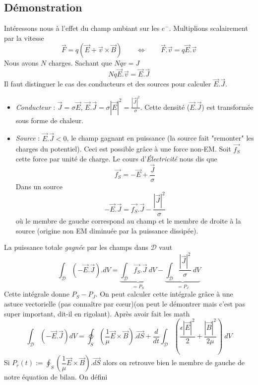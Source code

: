 	\subsection{Démonstration}
	Intéressons nous à l'effet du champ ambiant sur les $e^-$. Multiplions scalairement par la vitesse
	\begin{equation}
	\vec{F} = q(\vec{E}+\vec{v}\times\vec{B})\qquad \Leftrightarrow\qquad \vec{F}.\vec{v}=q\vec{E}.
	\vec{v}
	\end{equation}
	Nous avons $N$ charges. Sachant que $Nqv = J$
	\begin{equation}
	Nq\vec{E}.\vec{v} = \vec{E}.\vec{J}
	\end{equation}
	Il faut distinguer le cas des conducteurs et des sources pour calculer $\vec{E}.\vec{J}$. 
	\begin{itemize}
	\item \textit{Conducteur} : $\vec{J}=\sigma\vec{E}$, $\vec{E}.\vec{J} = \sigma|\vec{E}|^2=
	\frac{|\vec J|^2}{\sigma}$. Cette densité ($\vec{E}.\vec{J}$) est transformée sous forme 
	de chaleur.
	\item \textit{Source} : $\vec{E}.\vec{J}<0$, le champ gagnant en puissance (la source 
	fait "remonter" les charges du potentiel). Ceci est possible grâce à une force non-EM. Soit 
	$\vec{f_S}$ cette force par unité de charge. Le cours d'\textit{Électricité} nous dis que
	\begin{equation}
	\vec{f_S} = -\vec{E}+\dfrac{\vec{J}}{\sigma}
	\end{equation}
	Dans un source
	\begin{equation}
	-\vec{E}.\vec{J} = \vec{f_S}.\vec{J}-\dfrac{|\vec{J}|^2}{\sigma}
	\end{equation}
	où le membre de gauche correspond au champ et le membre de droite à la source (origine non EM 
	diminuée par la puissance dissipée).
	\end{itemize}		
	La puissance totale \textit{gagnée} par les champs dans $\mathcal{D}$ vaut
	\begin{equation}
	\int_\mathcal{D}(-\vec{E}.\vec{J}).dV = \underbrace{\int_\mathcal{D}\vec{f_S}.\vec{J}\ dV}_{=P_S}
	-\underbrace{\int_\mathcal{D}\dfrac{|\vec{J}|^2}{\sigma}\ dV}_{=P_J}
	\end{equation}
	Cette intégrale donne $P_S-P_J$. On peut calculer cette intégrale grâce à une astuce 
	vectorielle (pas connaître par cœur)(on peut le démontrer mais c'est pas super important, 
	dit-il en rigolant). Après avoir fait les math
	\begin{equation}
	\int_\mathcal{D}(-\vec{E}.\vec{J})dV = \oint_S\left(\dfrac{1}{\mu}\vec{E}\times\vec{B}\right)
	.\vec{dS} + \dfrac{d}{dt}\int_\mathcal{D}\left(\dfrac{\epsilon|\vec{E}|^2}{2}+\dfrac{|\vec{B}|^2}
	{2\mu}\right)\ dV
	\end{equation}
	Si $P_r(t) := \displaystyle\oint_S\left(\dfrac{1}{\mu}\vec{E}\times\vec{B}\right).\vec{dS}$ alors on retrouve 
	bien le membre de gauche de notre équation de bilan. On défini\\
	\ 
	
